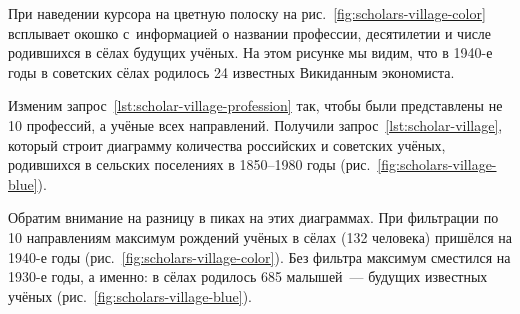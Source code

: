 При наведении курсора на цветную полоску на рис.~\ref{fig:scholars-village-color} 
всплывает окошко с~информацией о названии профессии, десятилетии и числе родившихся в сёлах будущих учёных. 
На этом рисунке мы видим, что в 1940-е годы в советских сёлах родилось 24 известных Викиданным экономиста.%

\begin{figure*}
    \setlength{\fboxsep}{0pt}%
    \setlength{\fboxrule}{1pt}%
	\label{fig:scholars-village-color}
    \caption[Диаграмма количества учёных по родам деятельности, родившихся в сёлах, 2022 год.]{Диаграмма количества учёных, родившихся в~сельских поселениях, с разбивкой дат рождения по десятилетиям. Фильтрация по нескольким профессиям (научным направлениям). Диаграмма построена в 2022 году по~запросу~\protect\ref{lst:scholar-village-profession}.}%
\end{figure*} 

Изменим запрос~\ref{lst:scholar-village-profession} так, 
чтобы были представлены не 10 профессий, а учёные всех направлений. 
Получили запрос~\ref{lst:scholar-village}, 
который строит диаграмму количества российских и советских учёных, 
родившихся в сельских поселениях в 1850--1980 годы (рис.~\ref{fig:scholars-village-blue}). 

Обратим внимание на разницу в пиках на этих диаграммах. 
При фильтрации по 10 направлениям максимум рождений учёных в сёлах (132 человека) 
пришёлся на 1940-е годы (рис.~\ref{fig:scholars-village-color}). 
Без фильтра максимум сместился на 1930-е годы, а именно: 
в сёлах родилось 685 малышей~--- будущих известных учёных (рис.~\ref{fig:scholars-village-blue}). 



